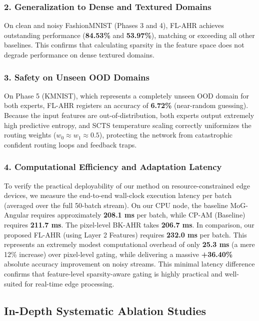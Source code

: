 \documentclass{article}
\theoremstyle{plain}
\theoremstyle{definition}
\theoremstyle{remark}
\begin{document}
\subsubsection*{2. Generalization to Dense and Textured Domains}
On clean and noisy FashionMNIST (Phases 3 and 4), FL-AHR achieves outstanding performance (\textbf{84.53\%} and \textbf{53.97\%}), matching or exceeding all other baselines. This confirms that calculating sparsity in the feature space does not degrade performance on dense textured domains.

\subsubsection*{3. Safety on Unseen OOD Domains}
On Phase 5 (KMNIST), which represents a completely unseen OOD domain for both experts, FL-AHR registers an accuracy of \textbf{6.72\%} (near-random guessing). Because the input features are out-of-distribution, both experts output extremely high predictive entropy, and SCTS temperature scaling correctly uniformizes the routing weights ($w_0 \approx w_1 \approx 0.5$), protecting the network from catastrophic confident routing loops and feedback traps.

\subsubsection*{4. Computational Efficiency and Adaptation Latency}
To verify the practical deployability of our method on resource-constrained edge devices, we measure the end-to-end wall-clock execution latency per batch (averaged over the full 50-batch stream). On our CPU node, the baseline MoG-Angular requires approximately \textbf{208.1 ms} per batch, while CP-AM (Baseline) requires \textbf{211.7 ms}. The pixel-level BK-AHR takes \textbf{206.7 ms}. In comparison, our proposed FL-AHR (using Layer 2 Features) requires \textbf{232.0 ms} per batch. This represents an extremely modest computational overhead of only \textbf{25.3 ms} (a mere 12\% increase) over pixel-level gating, while delivering a massive \textbf{+36.40\%} absolute accuracy improvement on noisy streams. This minimal latency difference confirms that feature-level sparsity-aware gating is highly practical and well-suited for real-time edge processing.

\subsection{In-Depth Systematic Ablation Studies}
\end{document}
